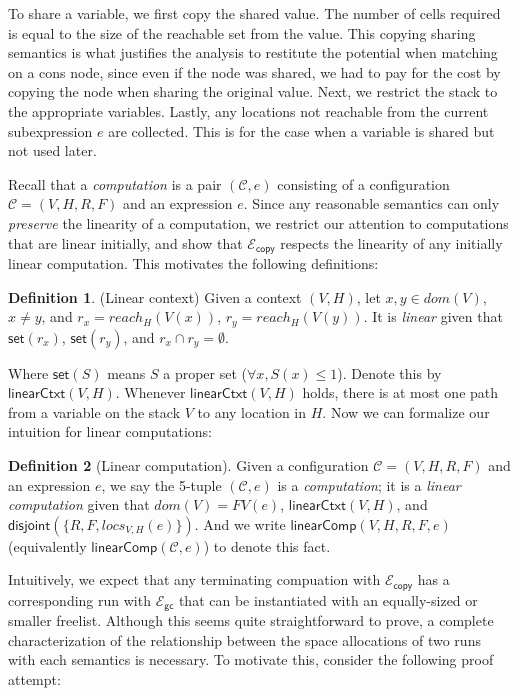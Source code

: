 \documentclass{easychair}
\newcommand{\ms}[1]{\ensuremath{\mathsf{#1}}}
\newcommand{\na}[1]{\mathsf{linearCtxt}(#1)}
\newcommand{\dist}[1]{\mathsf{disjoint}(#1)}
\newcommand{\wfc}[5]{\mathsf{linearComp}(#1,#2,#3,#4,#5)}
\newcommand{\linearComp}[2]{\mathsf{linearComp}(#1,#2)}
\newcommand{\gcSem}{\ensuremath{\mathcal{E}_{\ms{gc}}}}
\newcommand{\copySem}{\ensuremath{\mathcal{E}_{\ms{copy}}}}
\theoremstyle{definition}
\newtheorem{definition}{Definition}
\begin{document}
To share a variable, we first copy the shared value. The number of cells required is equal to the
size of the reachable set from the value. This copying sharing semantics is what justifies the 
analysis to restitute the potential when matching on a cons node, 
since even if the node was shared, we had to pay for the cost by copying the node when sharing the 
original value. Next, we restrict the stack to the appropriate variables. 
Lastly, any locations not reachable from the current subexpression $e$ are collected. This is 
for the case when a variable is shared but not used later.  

Recall that a \emph{computation} is a pair $(\mathcal{C},e)$ consisting of a configuration
$\mathcal{C} = (V,H,R,F)$ and an expression $e$. 
Since any reasonable semantics can only \emph{preserve} the linearity of a computation,
we restrict our attention to computations that are linear initially, and show that
\copySem{} respects the linearity of any initially linear computation. This motivates the following
definitions:

\begin{definition}(Linear context)
Given a context $(V,H)$, let
$x,y \in dom(V)$, $x \ne y$, and $r_x = reach_H(V(x))$, $r_y = reach_H(V(y))$.
	It is \emph{linear} given that  $\ms{set}(r_x)$, $\ms{set}(r_y)$, and $r_x \cap r_y = \emptyset$.
\end{definition}

Where $\ms{set}(S)$ means $S$ a proper set ($\forall x, S(x) \le 1$). 
Denote this by $\na{V,H}$. Whenever $\na{V,H}$ holds,
there is at 
most one path from a variable on the stack $V$ to any location in $H$. Now we can 
formalize our intuition for linear computations: 

\begin{definition}[Linear computation]
Given a configuration $\mathcal{C} = (V,H,R,F)$ and an expression $e$, 
we say the 5-tuple $(\mathcal{C},e)$ is a \emph{computation}; it is a \emph{linear computation} 
given that  $dom(V) = FV(e)$, $\na{V,H}$, and $\dist{\{R,F,locs_{V,H}(e)\}}$.
And we write $\wfc{V}{H}{R}{F}{e}$ (equivalently $\linearComp{\mathcal{C}}{e}$) to denote this fact.
\end{definition}

Intuitively, we expect that any terminating compuation
with \copySem{} has a corresponding run with \gcSem{} that can be instantiated with 
an equally-sized or smaller freelist. Although this seems quite straightforward to prove, a complete
characterization of the relationship between the space allocations of two runs with each 
semantics is necessary. To motivate this, consider the following proof attempt: 
\end{document}
